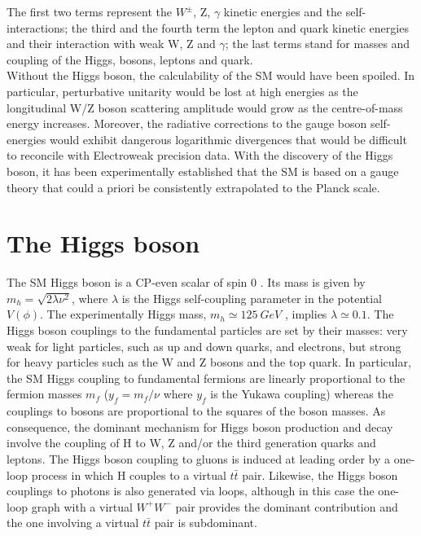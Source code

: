 The first two terms represent the $W^{\pm}$, Z, $\gamma$ kinetic energies and the self-interactions; the third and the fourth term the lepton and quark kinetic energies and their interaction with weak W, Z and $\gamma$; the last terms stand for masses and coupling of the Higgs, bosons, leptons and quark. \\
Without the Higgs boson, the calculability of the SM would have been spoiled. In particular, perturbative unitarity \cite{PerturbativeHiggs_1, PerturbativeHiggs_2} would be lost at high energies as the longitudinal W/Z boson scattering amplitude would grow as the centre-of-mass energy increases. Moreover, the radiative corrections to the gauge boson self-energies would exhibit dangerous logarithmic divergences that would be difficult to reconcile with Electroweak precision data. With the discovery of the Higgs boson, it has been experimentally established that the SM is based on a gauge theory that could a priori be consistently extrapolated to the Planck scale.

\section{The Higgs boson}
The SM Higgs boson is a CP-even scalar of spin 0 \cite{PDG}. Its mass is given by $m_{h} = \sqrt{2\lambda\nu^{2}}$, where $\lambda$ is the Higgs self-coupling parameter in the potential $V(\phi)$. The experimentally Higgs mass, $m_{h} \simeq 125\ GeV$ \cite{ALTAS_H, CMS_H}, implies $\lambda \simeq 0.1$. 
The Higgs boson couplings to the fundamental particles are set by their masses: very weak for light particles, such as up and down quarks, and electrons, but strong for heavy particles such as the W and Z bosons and the top quark. In particular, the SM Higgs coupling to fundamental fermions are linearly proportional to the fermion masses $m_{f}$ ($y_{f} = m_{f}/\nu$ where $y_{f}$ is the Yukawa coupling) whereas the couplings to bosons are proportional to the squares of the boson masses. As consequence, the dominant mechanism for Higgs boson production and decay involve the coupling of H to W, Z and/or the third generation quarks and leptons. The Higgs boson coupling to  gluons is induced at leading order by a one-loop process in which H couples to a virtual $t\bar{t}$ pair. Likewise, the Higgs boson couplings to photons is also generated via loops, although in this case the one-loop graph with a virtual $W^{+}W^{-}$ pair provides the dominant contribution and the one involving a virtual $t\bar{t}$ pair is subdominant. \\

